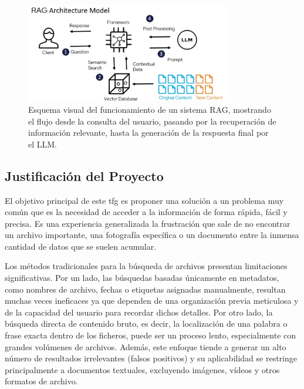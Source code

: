 \bigskip %
\begin{figure}[H] %
    \centering %
    \includegraphics[width=0.8\textwidth]{archivos/RAG_scheme.png} %
    \caption[Esquema de un sistema RAG]{Esquema visual del funcionamiento de un sistema RAG, mostrando el flujo desde la consulta del usuario, pasando por la recuperación de información relevante, hasta la generación de la respuesta final por el LLM.}
    \label{fig:rag_scheme} %
\end{figure}
\bigskip %

\subsection{Justificación del Proyecto}
El objetivo principal de este \gls{tfg} es proponer una solución a un problema muy común que es la necesidad de acceder a la información de forma rápida, fácil y precisa. Es una experiencia generalizada la frustración que sale de no encontrar un archivo importante, una fotografía específica o un documento entre la inmensa cantidad de datos que se suelen acumular.

Los métodos tradicionales para la búsqueda de archivos presentan limitaciones significativas. Por un lado, las búsquedas basadas únicamente en metadatos, como nombres de archivo, fechas o etiquetas asignadas manualmente, resultan muchas veces ineficaces ya que dependen de una organización previa meticulosa y de la capacidad del usuario para recordar dichos detalles. Por otro lado, la búsqueda directa de contenido bruto, es decir, la localización de una palabra o frase exacta dentro de los ficheros, puede ser un proceso lento, especialmente con grandes volúmenes de archivos. Además, este enfoque tiende a generar un alto número de resultados irrelevantes (falsos positivos) y su aplicabilidad se restringe principalmente a documentos textuales, excluyendo imágenes, vídeos y otros formatos de archivo.

